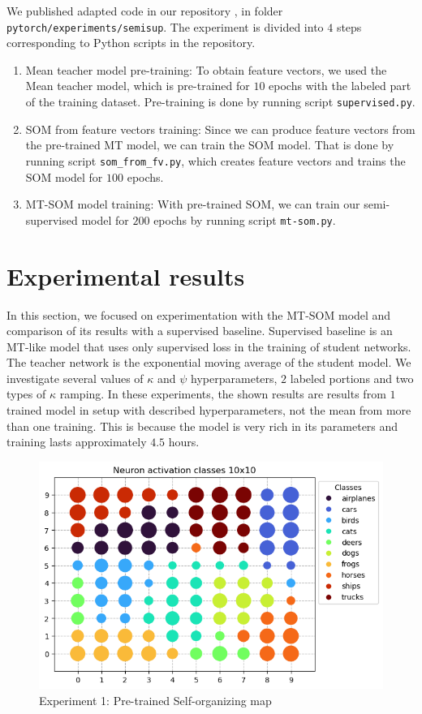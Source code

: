 We published adapted code in our repository \cite{dt-mt-repo}, in folder \\ \texttt{pytorch/experiments/semisup}. The experiment is divided into $4$ steps corresponding to Python scripts in the repository.
\begin{enumerate}
    \item Mean teacher model pre-training: To obtain feature vectors, we used the Mean teacher model, which is pre-trained for $10$ epochs with the labeled part of the training dataset. Pre-training is done by running script \texttt{supervised.py}.
    \item SOM from feature vectors training: Since we can produce feature vectors from the pre-trained MT model, we can train the SOM model. That is done by running script \texttt{som\_from\_fv.py}, which creates feature vectors and trains the SOM model for $100$ epochs.
    \item MT-SOM model training: With pre-trained SOM, we can train our semi-supervised model for $200$ epochs by running script \texttt{mt-som.py}.
\end{enumerate}


\section{Experimental results}

In this section, we focused on experimentation with the MT-SOM model and comparison of its results with a supervised baseline. Supervised baseline is an MT-like model that uses only supervised loss in the training of student networks. The teacher network is the exponential moving average of the student model. We investigate several values of $\kappa$ and $\psi$ hyperparameters, $2$ labeled portions and two types of $\kappa$ ramping. In these experiments, the shown results are results from $1$ trained model in setup with described hyperparameters, not the mean from more than one training. This is because the model is very rich in its parameters and training lasts approximately $4.5$ hours.


\begin{figure}[h!]
    \centering
    \includegraphics[width=0.8\linewidth]{figs/fv-10n-79ep-4000labeled.png}
    \caption{Experiment 1: Pre-trained Self-organizing map}
    \label{fig:exp1-som}
\end{figure}

